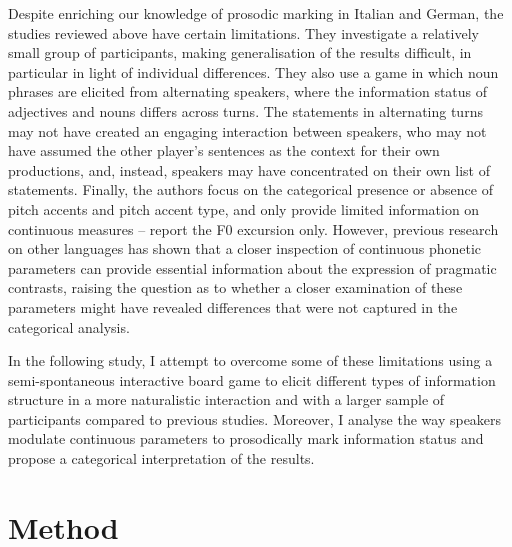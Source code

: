 Despite enriching our knowledge of prosodic marking in Italian and German, the studies reviewed above have certain limitations. They investigate a relatively small group of participants, making generalisation of the results difficult, in particular in light of individual differences. They also use a game in which noun phrases are elicited from alternating speakers, where the information status of adjectives and nouns differs across turns. The statements in alternating turns may not have created an engaging interaction between speakers, who may not have assumed the other player’s sentences as the context for their own productions, and, instead, speakers may have concentrated on their own list of statements. Finally, the authors focus on the categorical presence or absence of pitch accents and pitch accent type, and only provide limited information on continuous measures – \citet{SwertsEtAl2002} report the F0 excursion only. However, previous research on other languages has shown that a closer inspection of continuous phonetic parameters can provide essential information about the expression of pragmatic contrasts, raising the question as to whether a closer examination of these parameters might have revealed differences that were not captured in the categorical analysis.

In the following study, I attempt to overcome some of these limitations using a semi-spontaneous interactive board game to elicit different types of information structure in a more naturalistic interaction and with a larger sample of participants compared to previous studies. Moreover, I analyse the way speakers modulate continuous parameters to prosodically mark information status and propose a categorical interpretation of the results.

\section{Method}
\label{sec:2.2}
